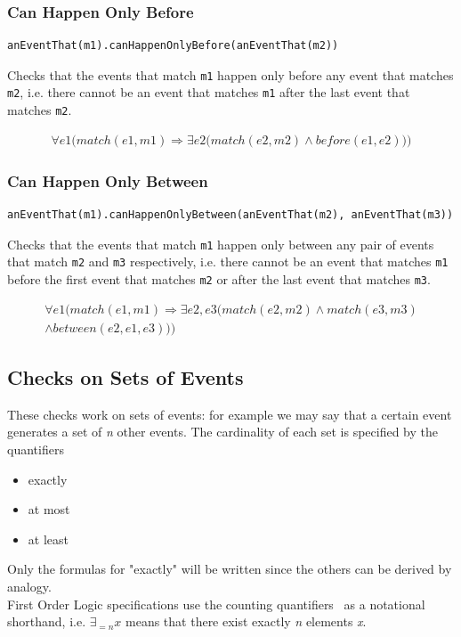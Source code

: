 \documentclass[11pt,a4paper,notitlepage]{article}
\begin{document}
\subsubsection{Can Happen Only Before}

\begin{lstlisting}
anEventThat(m1).canHappenOnlyBefore(anEventThat(m2))
\end{lstlisting}

Checks that the events that match \texttt{m1} happen only before any event that matches \texttt{m2}, i.e. there cannot be an event that matches \texttt{m1} after the last event that matches \texttt{m2}. 

\begin{multline*}
\forall e1 \bigg( match(e1, m1) \Rightarrow \exists e2 \Big( match(e2, m2) \land before(e1, e2) \Big) \bigg)
\end{multline*}

\subsubsection{Can Happen Only Between}

\begin{lstlisting}
anEventThat(m1).canHappenOnlyBetween(anEventThat(m2), anEventThat(m3))
\end{lstlisting}

Checks that the events that match \texttt{m1} happen only between any pair of events that match \texttt{m2} and \texttt{m3} respectively, i.e. there cannot be an event that matches \texttt{m1} before the first event that matches \texttt{m2} or after the last event that matches \texttt{m3}. 

\begin{multline*}
\forall e1 \bigg( match(e1, m1) \Rightarrow \exists e2, e3 \Big( match(e2, m2) \land match(e3, m3) \\ \land between(e2, e1, e3) \Big) \bigg)
\end{multline*}


\subsection{Checks on Sets of Events}

These checks work on sets of events: for example we may say that a certain event generates a set of \textit{n} other events. The cardinality of each set is specified by the quantifiers
\begin{itemize}
	\item exactly
	\item at most
	\item at least
\end{itemize}
Only the formulas for "exactly" will be written since the others can be derived by analogy.\bigskip \\
First Order Logic specifications use the counting quantifiers~\cite{Pratt-Hartmann:2014:LCE:2603088.2603117} as a notational shorthand, i.e. $\exists_{=n} x$ means that there exist exactly \textit{n} elements \textit{x}.
\end{document}
